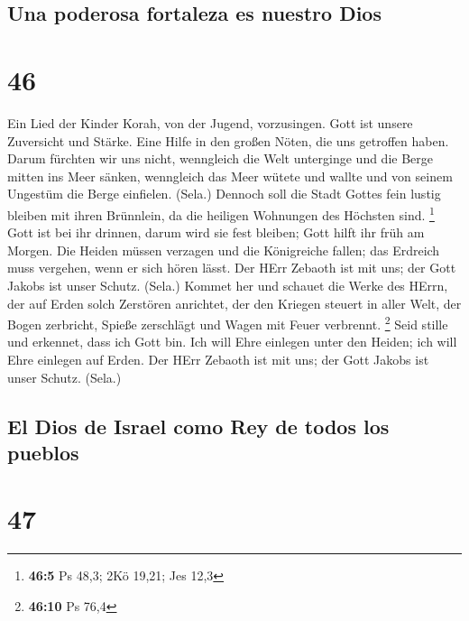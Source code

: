 \hypertarget{una-poderosa-fortaleza-es-nuestro-dios}{%
\subsection{Una poderosa fortaleza es nuestro
Dios}\label{una-poderosa-fortaleza-es-nuestro-dios}}

\hypertarget{section-45}{%
\section{46}\label{section-45}}

 Ein Lied der Kinder Korah, von der Jugend, vorzusingen.
 Gott ist unsere Zuversicht und Stärke. Eine Hilfe in den
großen Nöten, die uns getroffen haben.  Darum fürchten wir
uns nicht, wenngleich die Welt unterginge und die Berge mitten ins Meer
sänken,  wenngleich das Meer wütete und wallte und von
seinem Ungestüm die Berge einfielen. (Sela.)  Dennoch soll
die Stadt Gottes fein lustig bleiben mit ihren Brünnlein, da die
heiligen Wohnungen des Höchsten sind. \footnote{\textbf{46:5} Ps 48,3;
  2Kö 19,21; Jes 12,3}  Gott ist bei ihr drinnen, darum
wird sie fest bleiben; Gott hilft ihr früh am Morgen.  Die
Heiden müssen verzagen und die Königreiche fallen; das Erdreich muss
vergehen, wenn er sich hören lässt.  Der HErr Zebaoth ist
mit uns; der Gott Jakobs ist unser Schutz. (Sela.)  Kommet
her und schauet die Werke des HErrn, der auf Erden solch Zerstören
anrichtet,  der den Kriegen steuert in aller Welt, der
Bogen zerbricht, Spieße zerschlägt und Wagen mit Feuer verbrennt.
\footnote{\textbf{46:10} Ps 76,4}  Seid stille und
erkennet, dass ich Gott bin. Ich will Ehre einlegen unter den Heiden;
ich will Ehre einlegen auf Erden.  Der HErr Zebaoth ist
mit uns; der Gott Jakobs ist unser Schutz. (Sela.)

\hypertarget{el-dios-de-israel-como-rey-de-todos-los-pueblos}{%
\subsection{El Dios de Israel como Rey de todos los
pueblos}\label{el-dios-de-israel-como-rey-de-todos-los-pueblos}}

\hypertarget{section-46}{%
\section{47}\label{section-46}}

